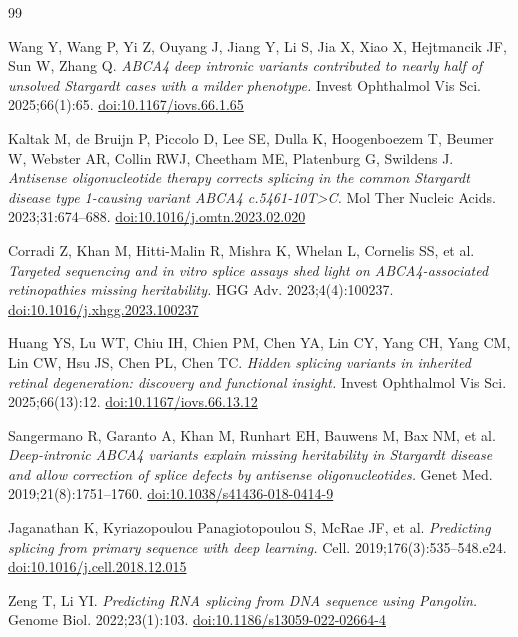 \documentclass[11pt,a4paper]{article}
\begin{document}
\clearpage
{}
\begin{thebibliography}{99}
\small

Wang Y, Wang P, Yi Z, Ouyang J, Jiang Y, Li S, Jia X, Xiao X, Hejtmancik JF, Sun W, Zhang Q.
\emph{ABCA4 deep intronic variants contributed to nearly half of unsolved Stargardt cases with a
milder phenotype.} Invest Ophthalmol Vis Sci. 2025;66(1):65.
\href{https://doi.org/10.1167/iovs.66.1.65}{doi:10.1167/iovs.66.1.65}

Kaltak M, de Bruijn P, Piccolo D, Lee SE, Dulla K, Hoogenboezem T, Beumer W, Webster AR,
Collin RWJ, Cheetham ME, Platenburg G, Swildens J.
\emph{Antisense oligonucleotide therapy corrects splicing in the common Stargardt disease type
1-causing variant ABCA4 c.5461-10T>C.} Mol Ther Nucleic Acids. 2023;31:674--688.
\href{https://doi.org/10.1016/j.omtn.2023.02.020}{doi:10.1016/j.omtn.2023.02.020}

Corradi Z, Khan M, Hitti-Malin R, Mishra K, Whelan L, Cornelis SS, et al.
\emph{Targeted sequencing and in vitro splice assays shed light on ABCA4-associated retinopathies
missing heritability.} HGG Adv. 2023;4(4):100237.
\href{https://doi.org/10.1016/j.xhgg.2023.100237}{doi:10.1016/j.xhgg.2023.100237}

Huang YS, Lu WT, Chiu IH, Chien PM, Chen YA, Lin CY, Yang CH, Yang CM, Lin CW, Hsu JS, Chen PL,
Chen TC. \emph{Hidden splicing variants in inherited retinal degeneration: discovery and functional
insight.} Invest Ophthalmol Vis Sci. 2025;66(13):12.
\href{https://doi.org/10.1167/iovs.66.13.12}{doi:10.1167/iovs.66.13.12}

Sangermano R, Garanto A, Khan M, Runhart EH, Bauwens M, Bax NM, et al.
\emph{Deep-intronic ABCA4 variants explain missing heritability in Stargardt disease and allow
correction of splice defects by antisense oligonucleotides.} Genet Med. 2019;21(8):1751--1760.
\href{https://doi.org/10.1038/s41436-018-0414-9}{doi:10.1038/s41436-018-0414-9}

Jaganathan K, Kyriazopoulou Panagiotopoulou S, McRae JF, et al.
\emph{Predicting splicing from primary sequence with deep learning.}
Cell. 2019;176(3):535--548.e24.
\href{https://doi.org/10.1016/j.cell.2018.12.015}{doi:10.1016/j.cell.2018.12.015}

Zeng T, Li YI. \emph{Predicting RNA splicing from DNA sequence using Pangolin.}
Genome Biol. 2022;23(1):103.
\href{https://doi.org/10.1186/s13059-022-02664-4}{doi:10.1186/s13059-022-02664-4}


\end{thebibliography}
\end{document}
